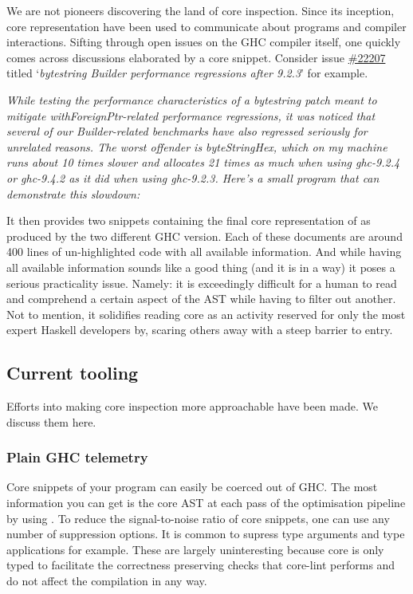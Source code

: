 We are not pioneers discovering the land of core inspection. Since its inception, core representation have
been used to communicate about programs and compiler interactions. Sifting through open issues on the
GHC compiler itself, one quickly comes across discussions elaborated by a core snippet. Consider issue
\href{https://gitlab.haskell.org/ghc/ghc/-/issues/22207}{\#22207} titled `\textit{bytestring Builder performance regressions after 9.2.3}' for example.
\hfill \break

\textit{While testing the performance characteristics of a bytestring patch meant to mitigate withForeignPtr-related performance regressions,
it was noticed that several of our Builder-related benchmarks have also regressed seriously for unrelated reasons.
The worst offender is byteStringHex, which on my machine runs about 10 times slower and allocates 21 times as much when using ghc-9.2.4 or ghc-9.4.2
as it did when using ghc-9.2.3. Here's a small program that can demonstrate this slowdown:}
\hfill \break

It then provides two snippets containing the final core representation of  as produced by the two different GHC version.
Each of these documents are around 400 lines of un-highlighted code with all available information. And while having all available information
sounds like a good thing (and it is in a way) it poses a serious practicality issue.
Namely: it is exceedingly difficult for a human to read and comprehend a certain aspect of the AST while having to filter out another.
Not to mention, it solidifies reading core as an activity reserved for only the most expert Haskell developers by, scaring others away with
a steep barrier to entry.

\subsection{Current tooling}
Efforts into making core inspection more approachable have been made. We discuss them here.

\subsubsection{Plain GHC telemetry}

Core snippets of your program can easily be coerced out of GHC. The most information you can get
is the core AST at each pass of the optimisation pipeline by using .
To reduce the signal-to-noise ratio of core snippets, one can use any number of suppression options.
It is common to supress type arguments and type applications for example. These are largely
uninteresting because core is only typed to facilitate the correctness preserving checks that core-lint performs
and do not affect the compilation in any way.


